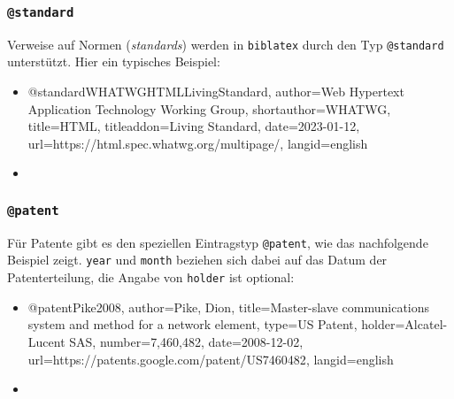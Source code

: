 
\subsubsection{\texttt{\bfseries @standard}}
\label{sec:@standard}

Verweise auf Normen (\emph{standards}) werden in \texttt{biblatex} durch den
Typ \texttt{@standard} unterstützt. Hier ein typisches Beispiel:
%
\begin{itemize}
\item[]
\begin{GenericCode}[numbers=none]
@standard{WHATWGHTMLLivingStandard,
  author={{Web Hypertext Application Technology Working Group}},
  shortauthor={WHATWG},
  title={HTML},
  titleaddon={Living Standard},
  date={2023-01-12},
  url={https://html.spec.whatwg.org/multipage/},
  langid={english}
}
\end{GenericCode}
\item[\cite{WHATWGHTMLLivingStandard}] 
\end{itemize}
%


\subsubsection{\texttt{\bfseries @patent}}
\label{sec:@patent}

Für Patente gibt es den speziellen Eintragstyp \texttt{@patent}, wie das
nachfolgende Beispiel zeigt. \texttt{year} und \texttt{month} beziehen sich
dabei auf das Datum der Patenterteilung, die Angabe von \texttt{holder} ist
optional:
%
\begin{itemize}
\item[]
\begin{GenericCode}[numbers=none]
@patent{Pike2008,
  author={Pike, Dion},
  title={Master-slave communications system and method for a network element},
  type={US Patent},
  holder={Alcatel-Lucent SAS},
  number={7,460,482},
  date={2008-12-02},
  url={https://patents.google.com/patent/US7460482},
  langid={english}
}
\end{GenericCode}
\item[\cite{Pike2008}] 
\end{itemize}
%


